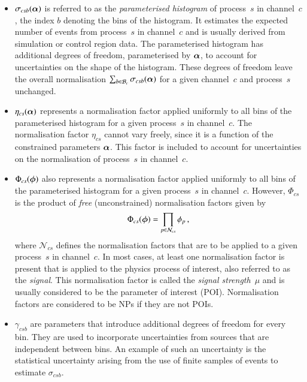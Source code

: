 \begin{itemize}

\item $\sigma_{csb}(\bm{\alpha})$ is referred to as the \emph{parameterised
    histogram} of process~$s$ in channel~$c$, the index $b$ denoting the bins of
  the histogram. It estimates the expected number of events from process~$s$ in
  channel~$c$ and is usually derived from simulation or control region data. The
  parameterised histogram has additional degrees of freedom, parameterised by
  $\bm{\alpha}$, to account for uncertainties on the shape of the
  histogram. These degrees of freedom leave the overall normalisation
  $\sum_{b \in \mathcal{B}_{c}} \sigma_{csb}(\bm{\alpha})$ for a given
  channel~$c$ and process~$s$ unchanged.

\item $\eta_{cs}(\bm{\alpha})$ represents a normalisation factor applied
  uniformly to all bins of the parameterised histogram for a given process~$s$
  in channel~$c$. The normalisation factor $\eta_{cs}$ cannot vary freely, since
  it is a function of the constrained parameters $\bm{\alpha}$. This factor
  is included to account for uncertainties on the normalisation of process~$s$
  in channel~$c$.

\item $\Phi_{cs}(\bm{\phi})$ also represents a normalisation factor applied
  uniformly to all bins of the parameterised histogram for a given process~$s$
  in channel~$c$. However, $\Phi_{cs}$ is the product of \emph{free}
  (unconstrained) normalisation factors given by
  \begin{align*}
    \Phi_{cs}(\bm{\phi}) = \prod_{p \in \mathcal{N}_{cs}} \phi_p \,\text{,}
  \end{align*}
  where $\mathcal{N}_{cs}$ defines the normalisation factors that are to be
  applied to a given process~$s$ in channel~$c$.
  In most cases, at least one normalisation factor is present that is applied to
  the physics process of interest, also referred to as the \emph{signal}. This
  normalisation factor is called the \emph{signal strength}~$\mu$ and is usually
  considered to be the parameter of interest (POI). Normalisation factors are
  considered to be NPs if they are not POIs.

\item $\gamma_{csb}$ are parameters that introduce additional degrees of freedom
  for every bin. They are used to incorporate uncertainties from sources that
  are independent between bins. An example of such an uncertainty is the
  statistical uncertainty arising from the use of finite samples of events to
  estimate $\sigma_{csb}$.


\end{itemize}
